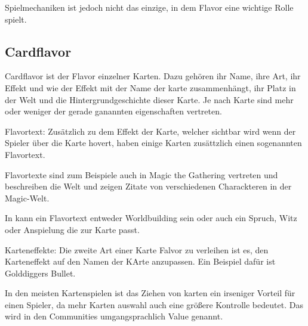 Spielmechaniken ist jedoch nicht das einzige, in dem Flavor eine wichtige Rolle spielt.

%
%

\subsection{Cardflavor}\label{subsec:cardflavor}

Cardflavor ist der Flavor einzelner Karten.
Dazu gehören ihr Name, ihre Art, ihr Effekt und wie der Effekt mit der Name der karte zusammenhängt,
ihr Platz in der Welt und die Hintergrundgeschichte dieser Karte. Je nach Karte sind mehr oder weniger der gerade ganannten
eigenschaften vertreten.


Flavortext:
Zusätzlich zu dem Effekt der Karte, welcher sichtbar wird wenn der Spieler über die Karte hovert, haben einige Karten zusättzlich einen sogenannten Flavortext.


Flavortexte sind zum Beispiele auch in Magic the Gathering vertreten und beschreiben die Welt und zeigen Zitate von verschiedenen Charackteren in der Magic-Welt.\cite{magicarena,soulOfTheGame}%


In \FF kann ein Flavortext entweder Worldbuilding sein oder auch ein Spruch, Witz oder Anspielung die zur Karte passt.


Karteneffekte:
Die zweite Art einer Karte Falvor zu verleihen ist es, den Karteneffekt auf den Namen der KArte anzupassen.
Ein Beispiel dafür ist Golddiggers Bullet.


In den meisten Kartenspielen ist das Ziehen von karten ein irseniger Vorteil
für einen Spieler, da mehr Karten auswahl auch eine größere Kontrolle bedeutet.
Das wird in den Communities umgangsprachlich Value genannt. \cite{whatsvalue}


